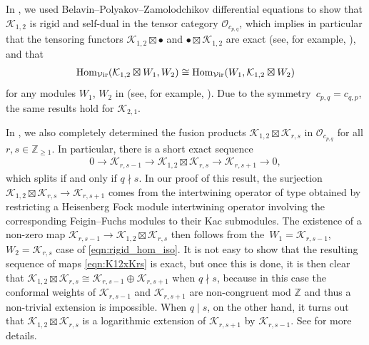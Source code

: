 \documentclass[pdftex]{sigma}
\numberwithin{equation}{section}
\theoremstyle{definition}
\begin{document}
In \cite{MS-cpq-Vir}, we used Belavin--Polyakov--Zamolodchikov differential equations to show that $\mathcal{K}_{1,2}$ is rigid and self-dual in the tensor category $\mathcal{O}_{c_{p,q}}$, which implies in particular that the tensoring functors $\mathcal{K}_{1,2}\boxtimes\bullet$ and $\bullet\boxtimes\mathcal{K}_{1,2}$ are exact (see, for example, \cite[Proposition 4.2.1]{EGNO}), and that
\begin{gather}\label{eqn:rigid_hom_iso}
\operatorname{Hom}_{\mathcal{V}{\rm ir}}(\mathcal{K}_{1,2}\boxtimes W_1, W_2)\cong\operatorname{Hom}_{\mathcal{V}{\rm ir}}(W_1,\mathcal{K}_{1,2}\boxtimes W_2)
\end{gather}
for any modules $W_1$, $W_2$ in  (see, for example, \cite[Proposition 2.10.8]{EGNO}). Due to the symmetry~${c_{p,q}=c_{q,p}}$, the same results hold for $\mathcal{K}_{2,1}$.

In \cite{MS-cpq-Vir}, we also completely determined the fusion products $\mathcal{K}_{1,2}\boxtimes\mathcal{K}_{r,s}$ in $\mathcal{O}_{c_{p,q}}$ for all $r,s\in\mathbb{Z}_{\geq 1}$. In particular, there is a short exact sequence
 \begin{gather}\label{eqn:K12xKrs}
 0\longrightarrow\mathcal{K}_{r,s-1}\longrightarrow\mathcal{K}_{1,2}\boxtimes\mathcal{K}_{r,s}\longrightarrow\mathcal{K}_{r,s+1}\longrightarrow 0,
 \end{gather}
which splits if and only if $q\nmid s$. In our proof of this result, the surjection $\mathcal{K}_{1,2}\boxtimes\mathcal{K}_{r,s}\rightarrow\mathcal{K}_{r,s+1}$ comes from the intertwining operator of type  obtained by restricting a Heisenberg Fock module intertwining operator involving the corresponding Feigin--Fuchs modules to their Kac submodules. The existence of a non-zero map $\mathcal{K}_{r,s-1}\rightarrow\mathcal{K}_{1,2}\boxtimes\mathcal{K}_{r,s}$ then follows from the~${W_1=\mathcal{K}_{r,s-1}}$, $W_2=\mathcal{K}_{r,s}$ case of \eqref{eqn:rigid_hom_iso}. It is not easy to show that the resulting sequence of maps \eqref{eqn:K12xKrs} is exact, but once this is done, it is then clear that $\mathcal{K}_{1,2}\boxtimes\mathcal{K}_{r,s}\cong\mathcal{K}_{r,s-1}\oplus\mathcal{K}_{r,s+1}$ when $q\nmid s$, because in this case the conformal weights of $\mathcal{K}_{r,s-1}$ and $\mathcal{K}_{r,s+1}$ are non-congruent mod $\mathbb{Z}$ and thus a non-trivial extension is impossible. When $q\mid s$, on the other hand, it turns out that $\mathcal{K}_{1,2}\boxtimes\mathcal{K}_{r,s}$ is a logarithmic extension of $\mathcal{K}_{r,s+1}$ by $\mathcal{K}_{r,s-1}$. See \cite{MS-cpq-Vir} for more details.
\end{document}
